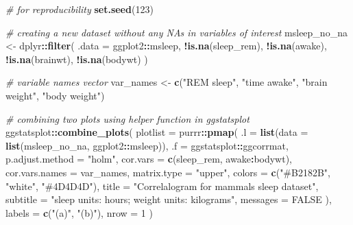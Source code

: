 \documentclass[
]{article}
\newenvironment{Shaded}{\begin{snugshade}}{\end{snugshade}}
\newcommand{\CommentTok}[1]{\textcolor[rgb]{0.56,0.35,0.01}{\textit{#1}}}
\newcommand{\DataTypeTok}[1]{\textcolor[rgb]{0.13,0.29,0.53}{#1}}
\newcommand{\DecValTok}[1]{\textcolor[rgb]{0.00,0.00,0.81}{#1}}
\newcommand{\KeywordTok}[1]{\textcolor[rgb]{0.13,0.29,0.53}{\textbf{#1}}}
\newcommand{\NormalTok}[1]{#1}
\newcommand{\OperatorTok}[1]{\textcolor[rgb]{0.81,0.36,0.00}{\textbf{#1}}}
\newcommand{\OtherTok}[1]{\textcolor[rgb]{0.56,0.35,0.01}{#1}}
\newcommand{\StringTok}[1]{\textcolor[rgb]{0.31,0.60,0.02}{#1}}
\begin{document}
\begin{Shaded}
\begin{Highlighting}[]
\CommentTok{\# for reproducibility}
\KeywordTok{set.seed}\NormalTok{(}\DecValTok{123}\NormalTok{)}

\CommentTok{\# creating a new dataset without any NAs in variables of interest}
\NormalTok{msleep\_no\_na <{-}}
\StringTok{  }\NormalTok{dplyr}\OperatorTok{::}\KeywordTok{filter}\NormalTok{(}
    \DataTypeTok{.data =}\NormalTok{ ggplot2}\OperatorTok{::}\NormalTok{msleep,}
    \OperatorTok{!}\KeywordTok{is.na}\NormalTok{(sleep\_rem), }\OperatorTok{!}\KeywordTok{is.na}\NormalTok{(awake), }\OperatorTok{!}\KeywordTok{is.na}\NormalTok{(brainwt), }\OperatorTok{!}\KeywordTok{is.na}\NormalTok{(bodywt)}
\NormalTok{  )}

\CommentTok{\# variable names vector}
\NormalTok{var\_names <{-}}\StringTok{ }\KeywordTok{c}\NormalTok{(}\StringTok{"REM sleep"}\NormalTok{, }\StringTok{"time awake"}\NormalTok{, }\StringTok{"brain weight"}\NormalTok{, }\StringTok{"body weight"}\NormalTok{)}

\CommentTok{\# combining two plots using helper function in \textasciigrave{}ggstatsplot\textasciigrave{}}
\NormalTok{ggstatsplot}\OperatorTok{::}\KeywordTok{combine\_plots}\NormalTok{(}
  \DataTypeTok{plotlist =}\NormalTok{ purrr}\OperatorTok{::}\KeywordTok{pmap}\NormalTok{(}
    \DataTypeTok{.l =} \KeywordTok{list}\NormalTok{(}\DataTypeTok{data =} \KeywordTok{list}\NormalTok{(msleep\_no\_na, ggplot2}\OperatorTok{::}\NormalTok{msleep)),}
    \DataTypeTok{.f =}\NormalTok{ ggstatsplot}\OperatorTok{::}\NormalTok{ggcorrmat,}
    \DataTypeTok{p.adjust.method =} \StringTok{"holm"}\NormalTok{,}
    \DataTypeTok{cor.vars =} \KeywordTok{c}\NormalTok{(sleep\_rem, awake}\OperatorTok{:}\NormalTok{bodywt),}
    \DataTypeTok{cor.vars.names =}\NormalTok{ var\_names,}
    \DataTypeTok{matrix.type =} \StringTok{"upper"}\NormalTok{,}
    \DataTypeTok{colors =} \KeywordTok{c}\NormalTok{(}\StringTok{"\#B2182B"}\NormalTok{, }\StringTok{"white"}\NormalTok{, }\StringTok{"\#4D4D4D"}\NormalTok{),}
    \DataTypeTok{title =} \StringTok{"Correlalogram for mammals sleep dataset"}\NormalTok{,}
    \DataTypeTok{subtitle =} \StringTok{"sleep units: hours; weight units: kilograms"}\NormalTok{,}
    \DataTypeTok{messages =} \OtherTok{FALSE}
\NormalTok{  ),}
  \DataTypeTok{labels =} \KeywordTok{c}\NormalTok{(}\StringTok{"(a)"}\NormalTok{, }\StringTok{"(b)"}\NormalTok{),}
  \DataTypeTok{nrow =} \DecValTok{1}
\NormalTok{)}
\end{Highlighting}
\end{Shaded}
\end{document}
